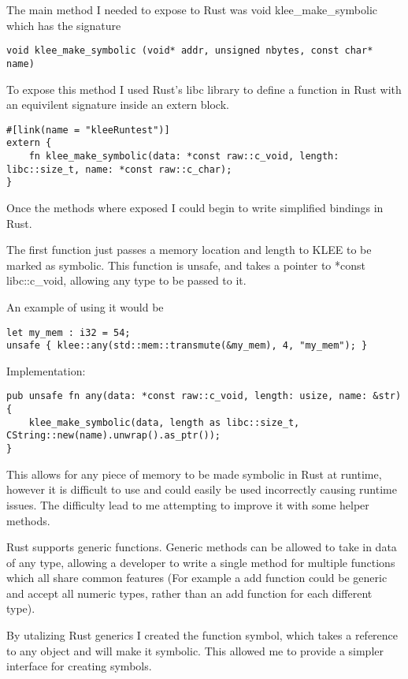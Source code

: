 \documentclass{report}
\begin{document}
The main method I needed to expose to Rust was void klee_make_symbolic which has the signature
\begin{lstlisting}
void klee_make_symbolic	(void* addr, unsigned nbytes, const char* name)
\end{lstlisting}

To expose this method I used Rust's libc library to define a function in Rust with an equivilent signature inside an extern block.

\begin{lstlisting}
#[link(name = "kleeRuntest")]
extern {
    fn klee_make_symbolic(data: *const raw::c_void, length: libc::size_t, name: *const raw::c_char);
}
\end{lstlisting}

Once the methods where exposed I could begin to write simplified bindings in Rust.

The first function just passes a memory location and length to KLEE to be marked as symbolic. This function is unsafe, and takes a pointer to *const libc::c_void, allowing any type to be passed to it.

An example of using it would be
\begin {lstlisting}
let my_mem : i32 = 54;
unsafe { klee::any(std::mem::transmute(&my_mem), 4, "my_mem"); }
\end{lstlisting}

Implementation:
\begin {lstlisting}
pub unsafe fn any(data: *const raw::c_void, length: usize, name: &str) {
    klee_make_symbolic(data, length as libc::size_t, CString::new(name).unwrap().as_ptr());
}
\end{lstlisting}

This allows for any piece of memory to be made symbolic in Rust at runtime, however it is difficult to use and could easily be used incorrectly causing runtime issues. The difficulty lead to me attempting to improve it with some helper methods.

Rust supports generic functions. Generic methods can be allowed to take in data of any type, allowing a developer to write a single method for multiple functions which all share common features (For example a add function could be generic and accept all numeric types, rather than an add function for each different type).

By utalizing Rust generics I created the function symbol, which takes a reference to any object and will make it symbolic. This allowed me to provide a simpler interface for creating symbols.
\end{document}
